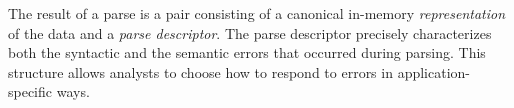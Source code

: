 \documentclass[11pt]{article}
\begin{document}
The result of a parse is a pair consisting of a canonical
in-memory {\em representation} of the data and a {\em parse descriptor}. 
The parse
descriptor precisely characterizes both the syntactic and the semantic
errors that occurred during parsing.  This structure allows analysts
to choose how to respond to errors in application-specific ways.



\end{document}
